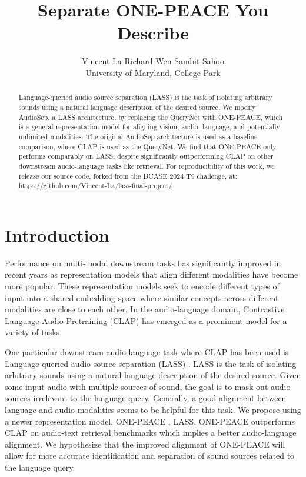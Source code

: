\documentclass[11pt]{article}
\title{Separate ONE-PEACE You Describe}
\author{Vincent La \quad Richard Wen \quad Sambit Sahoo \\
        University of Maryland, College Park}
\begin{document}
\maketitle

\begin{abstract}

Language-queried audio source separation (LASS) is the task of isolating arbitrary sounds using a natural language description of the desired source. We modify AudioSep, a LASS architecture, by replacing the QueryNet with ONE-PEACE, which is a general representation model for aligning vision, audio, language, and potentially unlimited modalities. The original AudioSep architecture is used as a baseline comparison, where CLAP is used as the QueryNet. We find that ONE-PEACE only performs comparably on LASS, despite significantly outperforming CLAP on other downstream audio-language tasks like retrieval. For reproducibility of this work, we release our source code, forked from the DCASE 2024 T9 challenge, at: \url{https://github.com/Vincent-La/lass-final-project/}

\end{abstract}

\section{Introduction}
Performance on multi-modal downstream tasks has significantly improved in recent years as representation models that align different modalities have become more popular. These representation models seek to encode different types of input into a shared embedding space where similar concepts across different modalities are close to each other. In the audio-language domain, Contrastive Language-Audio Pretraining (CLAP) \cite{clap} has emerged as a prominent model for a variety of tasks.

One particular downstream audio-language task where CLAP has been used is Language-queried audio source separation (LASS) \cite{lass}. LASS is the task of isolating arbitrary sounds using a natural language description of the desired source. Given some input audio with multiple sources of sound, the goal is to mask out audio sources irrelevant to the language query. Generally, a good alignment between language and audio modalities seems to be helpful for this task. We propose using a newer representation model, ONE-PEACE \cite{onepeace}, LASS. ONE-PEACE outperforms CLAP on audio-text retrieval benchmarks which implies a better audio-language alignment. We hypothesize that the improved alignment of ONE-PEACE will allow for more accurate identification and separation of sound sources related to the language query. 
\end{document}
